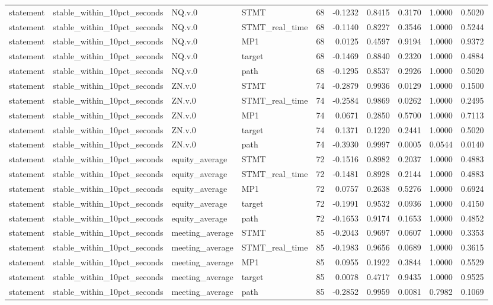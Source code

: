 \begin{tabular}{llllrrrrrr}
statement & stable_within_10pct_seconds & NQ.v.0 & STMT & 68 & -0.1232 & 0.8415 & 0.3170 & 1.0000 & 0.5020 \\
statement & stable_within_10pct_seconds & NQ.v.0 & STMT_real_time & 68 & -0.1140 & 0.8227 & 0.3546 & 1.0000 & 0.5244 \\
statement & stable_within_10pct_seconds & NQ.v.0 & MP1 & 68 & 0.0125 & 0.4597 & 0.9194 & 1.0000 & 0.9372 \\
statement & stable_within_10pct_seconds & NQ.v.0 & target & 68 & -0.1469 & 0.8840 & 0.2320 & 1.0000 & 0.4884 \\
statement & stable_within_10pct_seconds & NQ.v.0 & path & 68 & -0.1295 & 0.8537 & 0.2926 & 1.0000 & 0.5020 \\
statement & stable_within_10pct_seconds & ZN.v.0 & STMT & 74 & -0.2879 & 0.9936 & 0.0129 & 1.0000 & 0.1500 \\
statement & stable_within_10pct_seconds & ZN.v.0 & STMT_real_time & 74 & -0.2584 & 0.9869 & 0.0262 & 1.0000 & 0.2495 \\
statement & stable_within_10pct_seconds & ZN.v.0 & MP1 & 74 & 0.0671 & 0.2850 & 0.5700 & 1.0000 & 0.7113 \\
statement & stable_within_10pct_seconds & ZN.v.0 & target & 74 & 0.1371 & 0.1220 & 0.2441 & 1.0000 & 0.5020 \\
statement & stable_within_10pct_seconds & ZN.v.0 & path & 74 & -0.3930 & 0.9997 & 0.0005 & 0.0544 & 0.0140 \\
statement & stable_within_10pct_seconds & equity_average & STMT & 72 & -0.1516 & 0.8982 & 0.2037 & 1.0000 & 0.4883 \\
statement & stable_within_10pct_seconds & equity_average & STMT_real_time & 72 & -0.1481 & 0.8928 & 0.2144 & 1.0000 & 0.4883 \\
statement & stable_within_10pct_seconds & equity_average & MP1 & 72 & 0.0757 & 0.2638 & 0.5276 & 1.0000 & 0.6924 \\
statement & stable_within_10pct_seconds & equity_average & target & 72 & -0.1991 & 0.9532 & 0.0936 & 1.0000 & 0.4150 \\
statement & stable_within_10pct_seconds & equity_average & path & 72 & -0.1653 & 0.9174 & 0.1653 & 1.0000 & 0.4852 \\
statement & stable_within_10pct_seconds & meeting_average & STMT & 85 & -0.2043 & 0.9697 & 0.0607 & 1.0000 & 0.3353 \\
statement & stable_within_10pct_seconds & meeting_average & STMT_real_time & 85 & -0.1983 & 0.9656 & 0.0689 & 1.0000 & 0.3615 \\
statement & stable_within_10pct_seconds & meeting_average & MP1 & 85 & 0.0955 & 0.1922 & 0.3844 & 1.0000 & 0.5529 \\
statement & stable_within_10pct_seconds & meeting_average & target & 85 & 0.0078 & 0.4717 & 0.9435 & 1.0000 & 0.9525 \\
statement & stable_within_10pct_seconds & meeting_average & path & 85 & -0.2852 & 0.9959 & 0.0081 & 0.7982 & 0.1069 \\
\bottomrule
\end{tabular}
